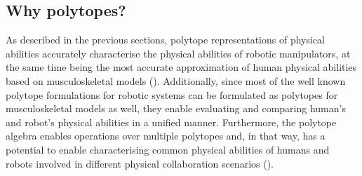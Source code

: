 

\subsection{Why polytopes?}

As described in the previous sections, polytope representations of physical abilities accurately 
characterise the physical abilities of robotic manipulators, at the same time being the most accurate approximation of human physical abilities based on musculoskeletal models (). Additionally, since most of the well known polytope formulations for robotic systems can be formulated as polytopes for musculoskeletal models as well, they enable evaluating and comparing human's and robot's physical abilities in a unified manner. Furthermore, the polytope algebra enables operations over multiple polytopes and, in that way, has a potential to enable characterising common physical abilities of humans and robots involved in different physical collaboration scenarios ().

